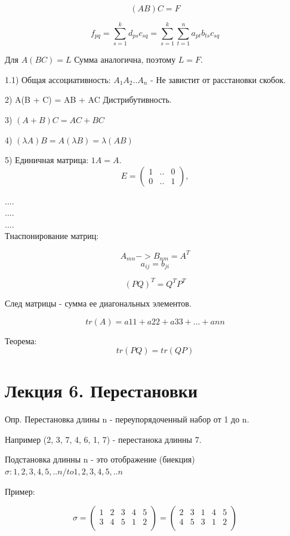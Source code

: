 \documentclass[a4paper]{article}
\begin{document}
$$(A B) C = F$$

$$f_{pq} = \sum^k_{s=1}d_{ps}c_{sq} = \sum^k_{s=1}\sum^n_{t=1}a_{pt}b_{ts}c_{sq}$$


Для $A (B C) = L$ Сумма аналогична, поэтому $L = F$.

1.1) Общая ассоциативность: $A_1A_2..A_n$ - Не завистит от расстановки скобок.


2) A(B + C) = AB + AC Дистрибутивность.


3) $(A + B)C = AC + BC$


4) $(\lambda A)B = A(\lambda B) = \lambda (AB)$



5) Единичная матрица: $ 1A = A$.
\begin{equation*}
E =  
\begin{pmatrix}
   1 & .. & 0\\
     0& ..&  1
\end{pmatrix},
\end{equation*}



....\\
....\\
....\\


Тнаспонирование матриц:

$$A_{mn} -> B_{nm} = A^T$$
$$a_{ij} = b_{ji}$$

$$(PQ)^T = Q^TP^T$$

След матрицы - сумма ее диагональных элементов.

$$tr(A) = a{11} + a{22} + a{33} + ... + a{nn}$$

Теорема:
$$ tr(PQ) = tr(QP)$$





\section*{Лекция 6. Перестановки}


Опр. Перестановка длины n - переупорядоченный набор от 1 до n.

Например (2, 3, 7, 4, 6, 1, 7) - перестанока длинны 7.

Подстановка длинны n - это отображение  (биекция) $\sigma :{1,2,3,4,5,..n} /to {1,2,3,4,5,..n}$


Пример:

\begin{equation*}
\sigma = 
\begin{pmatrix}
	1 & 2 &3 & 4 & 5\\
	3 & 4 & 5 & 1 & 2\\	
\end{pmatrix}
=
\begin{pmatrix}
	2 & 3 &1 & 4 & 5\\
	4 & 5& 3 & 1 & 2\\	
\end{pmatrix}
\end{equation*}
\end{document}
